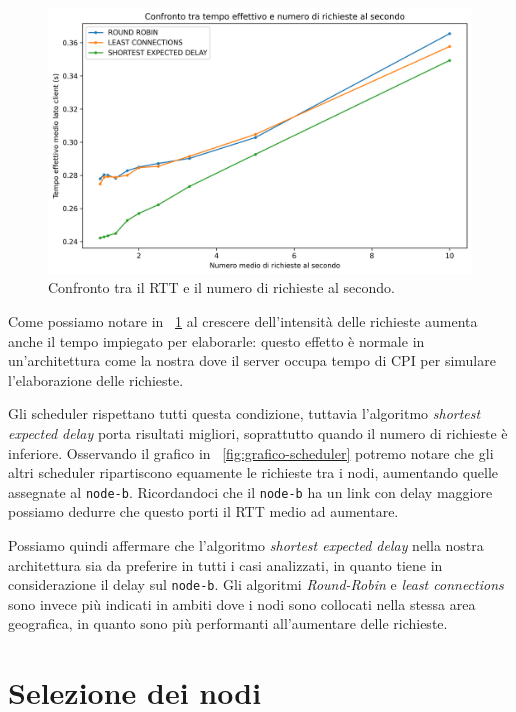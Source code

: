 \documentclass[12pt, hidelinks]{report}
\begin{document}
\begin{figure}[H]
    \centering
    \includegraphics[width=\linewidth]{14_grafico_rtt.png}
    \caption{Confronto tra il RTT e il numero di richieste al secondo.}
    \label{fig:grafico-rtt}
\end{figure}

Come possiamo notare in \figurename~\ref{fig:grafico-rtt} al crescere dell'intensità delle richieste aumenta anche il tempo impiegato per elaborarle: questo effetto è normale in un'architettura come la nostra dove il server occupa tempo di CPI per simulare l'elaborazione delle richieste.

Gli scheduler rispettano tutti questa condizione, tuttavia l'algoritmo \textit{shortest expected delay} porta risultati migliori, soprattutto quando il numero di richieste è inferiore. Osservando il grafico in \figurename~\ref{fig:grafico-scheduler} potremo notare che gli altri scheduler ripartiscono equamente le richieste tra i nodi, aumentando quelle assegnate al \texttt{node-b}. Ricordandoci che il \texttt{node-b} ha un link con delay maggiore possiamo dedurre che questo porti il RTT medio ad aumentare.

Possiamo quindi affermare che l'algoritmo \textit{shortest expected delay} nella nostra architettura sia da preferire in tutti i casi analizzati, in quanto tiene in considerazione il delay sul \texttt{node-b}. Gli algoritmi \textit{Round-Robin} e \textit{least connections} sono invece più indicati in ambiti dove i nodi sono collocati nella stessa area geografica, in quanto sono più performanti all'aumentare delle richieste.

\section{Selezione dei nodi}
\end{document}
